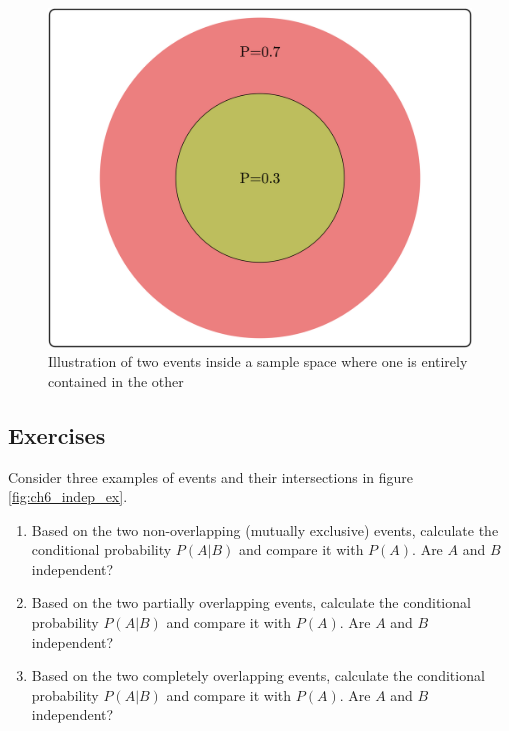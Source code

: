 \documentclass[
  letterpaper,
  DIV=11,
  numbers=noendperiod]{scrreprt}
\begin{document}
\begin{figure}

{\centering \includegraphics{./ch6/indep_ex3.png}

}

\caption{Illustration of two events inside a sample space where one is
entirely contained in the other}

\end{figure}

\hypertarget{exercises-27}{%
\subsection{Exercises}\label{exercises-27}}

Consider three examples of events and their intersections in figure
\ref{fig:ch6_indep_ex}.

\begin{enumerate}
\def\labelenumi{\arabic{enumi}.}
\item
  Based on the two non-overlapping (mutually exclusive) events,
  calculate the conditional probability \(P(A|B)\) and compare it with
  \(P(A)\). Are \(A\) and \(B\) independent?
\item
  Based on the two partially overlapping events, calculate the
  conditional probability \(P(A|B)\) and compare it with \(P(A)\). Are
  \(A\) and \(B\) independent?
\item
  Based on the two completely overlapping events, calculate the
  conditional probability \(P(A|B)\) and compare it with \(P(A)\). Are
  \(A\) and \(B\) independent?
\end{enumerate}
\end{document}
